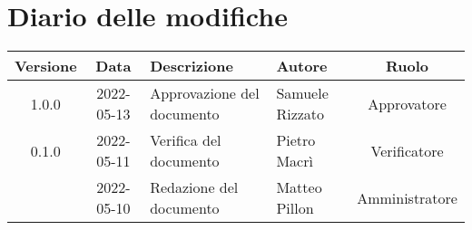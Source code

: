 \section*{Diario delle modifiche}
	\begin{center}
	\renewcommand{\arraystretch}{1.8} %
	\begin{tabular}{ |c|c|m{12em}|m{7em}|c| }
	\hline
	\textbf{Versione} & \textbf{Data} & \textbf{Descrizione} &  \textbf{Autore} &  \textbf{Ruolo} \\ %
	\hline
	1.0.0 & 2022-05-13 & Approvazione del documento & Samuele \newline Rizzato & Approvatore\\
	\hline
	0.1.0 & 2022-05-11 & Verifica del documento & Pietro Macrì & Verificatore\\
	\hline
    & 2022-05-10 & Redazione del documento & Matteo Pillon & Amministratore\\ %
	\hline
	\end{tabular}
	\end{center}
	\newpage